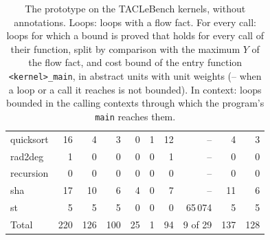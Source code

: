 \documentclass[oneside,english]{amsart}
\numberwithin{equation}{section}
\numberwithin{figure}{section}
\theoremstyle{plain}
\theoremstyle{definition}
\theoremstyle{plain}
\theoremstyle{remark}
\theoremstyle{plain}
\theoremstyle{definition}
\theoremstyle{plain}
\theoremstyle{remark}
\begin{document}
\begin{table}[ht]
\begin{tabular}{@{}lrrrrrrrrr@{}}
quicksort & 16 & 4 & 3 & 0 & 1 & 12 & -- & 4 & 3 \\
rad2deg & 1 & 0 & 0 & 0 & 0 & 1 & -- & 0 & 0 \\
recursion & 0 & 0 & 0 & 0 & 0 & 0 & -- & 0 & 0 \\
sha & 17 & 10 & 6 & 4 & 0 & 7 & -- & 11 & 6 \\
st & 5 & 5 & 5 & 0 & 0 & 0 & 65\,074 & 5 & 5 \\
\midrule
Total & 220 & 126 & 100 & 25 & 1 & 94 & 9 of 29 & 137 & 128 \\
\bottomrule
\end{tabular}
\caption{The prototype on the TACLeBench kernels, without annotations. Loops: loops with a flow fact. For every call: loops for which a bound is proved that holds for every call of their function, split by comparison with the maximum $Y$ of the flow fact, and cost bound of the entry function \texttt{<kernel>\_main}, in abstract units with unit weights (-- when a loop or a call it reaches is not bounded). In context: loops bounded in the calling contexts through which the program's \texttt{main} reaches them.}
\label{tab:tacle}
\end{table}
\end{document}
